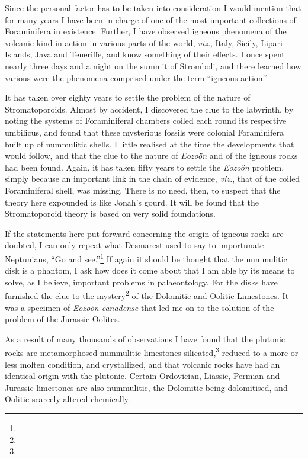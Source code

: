 \documentclass[a4paper, 12pt, oneside]{article}
\begin{document}
Since the personal factor has to be taken into consideration I would mention that for many years I have been in charge of one of the most important collections of Foraminifera in existence. Further, I have observed igneous phenomena of the volcanic kind in action in various parts of the world, \emph{viz.}, Italy, Sicily, Lipari Islands, Java and Teneriffe, and know something of their effects. I once spent nearly three days and a night on the summit of Stromboli, and there learned how various were the phenomena comprised under the term ``igneous action.''

It has taken over eighty years to settle the problem of the nature of Stromatoporoids. Almost by accident, I discovered the clue to the labyrinth, by noting the systems of Foraminiferal chambers coiled each round its respective umbilicus, and found that these mysterious fossils were colonial Foraminifera built up of nummulitic shells. I little realised at the time the developments that would follow, and that the clue to the nature of \emph{Eozoön} and of the igneous rocks had been found. Again, it has taken fifty years to settle the \emph{Eozoön} problem, simply because an important link in the chain of evidence, \emph{viz.}, that of the coiled Foraminiferal shell, was missing. There is no need, then, to suspect that the theory here expounded is like Jonah's gourd. It will be found that the Stromatoporoid theory is based on very solid foundations.

If the statements here put forward concerning the origin of igneous rocks are doubted, I can only repeat what Desmarest used to say to importunate Neptunians, ``Go and see.''\footnote{} If again it should be thought that the nummulitic disk is a phantom, I ask how does it come about that I am able by its means to solve, as I believe, important problems in palaeontology. For the disks have furnished the clue to the mystery\footnote{} of the Dolomitic and Oolitic Limestones. It was a specimen of \emph{Eozoön canadense} that led me on to the solution of the problem of the Jurassic Oolites.

As a result of many thousands of observations I have found that the plutonic rocks are metamorphosed nummulitic limestones silicated,\footnote{} reduced to a more or less molten condition, and crystallized, and that volcanic rocks have had an identical origin with the plutonic. Certain Ordovician, Liassic, Permian and Jurassic limestones are also nummulitic, the Dolomitic being dolomitised, and Oolitic scarcely altered chemically.
\end{document}
